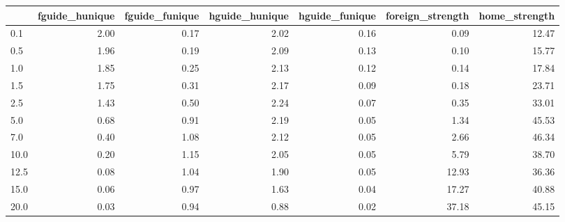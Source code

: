 \begin{tabular}{lrrrrrr}
\toprule
 & fguide_hunique & fguide_funique & hguide_hunique & hguide_funique & foreign_strength & home_strength \\
\midrule
0.1 & 2.00 & 0.17 & 2.02 & 0.16 & 0.09 & 12.47 \\
0.5 & 1.96 & 0.19 & 2.09 & 0.13 & 0.10 & 15.77 \\
1.0 & 1.85 & 0.25 & 2.13 & 0.12 & 0.14 & 17.84 \\
1.5 & 1.75 & 0.31 & 2.17 & 0.09 & 0.18 & 23.71 \\
2.5 & 1.43 & 0.50 & 2.24 & 0.07 & 0.35 & 33.01 \\
5.0 & 0.68 & 0.91 & 2.19 & 0.05 & 1.34 & 45.53 \\
7.0 & 0.40 & 1.08 & 2.12 & 0.05 & 2.66 & 46.34 \\
10.0 & 0.20 & 1.15 & 2.05 & 0.05 & 5.79 & 38.70 \\
12.5 & 0.08 & 1.04 & 1.90 & 0.05 & 12.93 & 36.36 \\
15.0 & 0.06 & 0.97 & 1.63 & 0.04 & 17.27 & 40.88 \\
20.0 & 0.03 & 0.94 & 0.88 & 0.02 & 37.18 & 45.15 \\
\bottomrule
\end{tabular}
